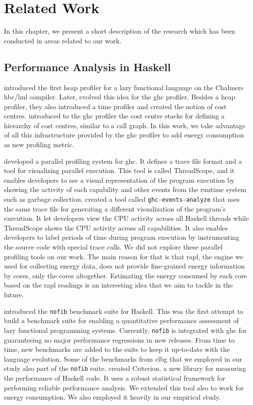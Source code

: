 \chapter{Related Work}\label{chp:related}
In this chapter, we present a short description of the research which has been conducted in areas related to our work.


\section{Performance Analysis in Haskell}
 introduced the first heap profiler for a lazy functional language on the Chalmers hbc/lml compiler. Later,  evolved this idea for the \ac{ghc} profiler. Besides a heap profiler, they also introduced a time profiler and created the notion of cost centres.  introduced to the \ac{ghc} profiler the cost centre stacks for defining a hierarchy of cost centres, similar to a call graph. In this work, we take advantage of all this infrastructure provided by the \ac{ghc} profiler to add energy consumption as new profiling metric.

 developed a parallel profiling system for \ac{ghc}. It defines a trace file format and a tool for visualizing parallel execution. This tool is called ThreadScope, and it enables developers to see a visual representation of the program execution by showing the activity of each capability and other events from the runtime system such as garbage collection.  created a tool called \texttt{ghc-events-analyze} that uses the same trace file for generating a different visualization of the program's execution. It let developers view the CPU activity across all Haskell threads while ThreadScope shows the CPU activity across all capabilities. It also enables developers to label periods of time during program execution by instrumenting the source code with special trace calls. We did not explore these parallel profiling tools on our work. The main reason for that is that \ac{rapl}, the engine we used for collecting energy data, does not provide fine-grained energy information by cores, only the cores altogether. Estimating the energy consumed by each core based on the \ac{rapl} readings is an interesting idea that we aim to tackle in the future.

 introduced the \texttt{nofib} benchmark suite for Haskell. This was the first attempt to build a benchmark suite for enabling a quantitative performance assessment of lazy functional programming systems. Currently, \texttt{nofib} is integrated with \ac{ghc} for guaranteeing no major performance regressions in new releases. From time to time, new benchmarks are added to the suite to keep it up-to-date with the language evolution. Some of the benchmarks from \acl{clbg} that we employed in our study also part of the \texttt{nofib} suite.  created Criterion, a new library for measuring the performance of Haskell code. It uses a robust statistical framework for performing reliable performance analysis. We extended this tool also to work for energy consumption. We also employed it heavily in our empirical study.


